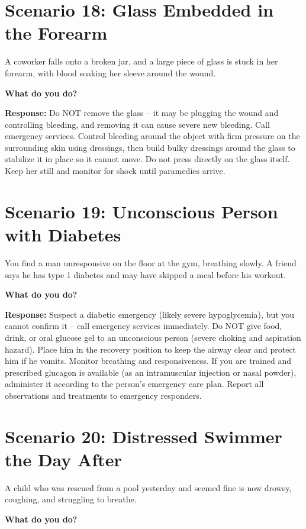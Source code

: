 \section{Scenario 18: Glass Embedded in the Forearm}

A coworker falls onto a broken jar, and a large piece of glass is stuck in her forearm, with blood soaking her sleeve around the wound.

\textbf{What do you do?}

\textbf{Response:} Do NOT remove the glass -- it may be plugging the wound and controlling bleeding, and removing it can cause severe new bleeding. Call emergency services. Control bleeding around the object with firm pressure on the surrounding skin using dressings, then build bulky dressings around the glass to stabilize it in place so it cannot move. Do not press directly on the glass itself. Keep her still and monitor for shock until paramedics arrive.

\section{Scenario 19: Unconscious Person with Diabetes}

You find a man unresponsive on the floor at the gym, breathing slowly. A friend says he has type 1 diabetes and may have skipped a meal before his workout.

\textbf{What do you do?}

\textbf{Response:} Suspect a diabetic emergency (likely severe hypoglycemia), but you cannot confirm it -- call emergency services immediately. Do NOT give food, drink, or oral glucose gel to an unconscious person (severe choking and aspiration hazard). Place him in the recovery position to keep the airway clear and protect him if he vomits. Monitor breathing and responsiveness. If you are trained and prescribed glucagon is available (as an intramuscular injection or nasal powder), administer it according to the person's emergency care plan. Report all observations and treatments to emergency responders.

\section{Scenario 20: Distressed Swimmer the Day After}

A child who was rescued from a pool yesterday and seemed fine is now drowsy, coughing, and struggling to breathe.

\textbf{What do you do?}


